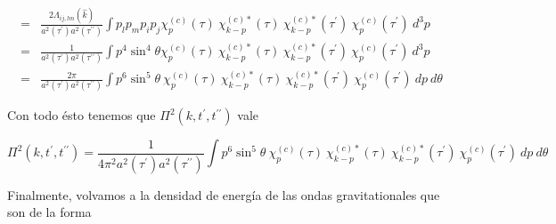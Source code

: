 \begin{equation*}
\begin{split}
        =& \frac{2 \Lambda_{ij,lm} (\hat{k})}{a^2 \left( \tau^\prime \right) a^2 \left( \tau^{\prime \prime} \right)} \int p_l p_m p_i p_j \chi^{(c)}_{p} (\tau) ~ \chi_{k - p}^{(c) *} (\tau) ~ \chi^{(c) *}_{k - p} (\tau^\prime) ~ \chi^{(c)}_{p} (\tau^\prime) ~ d^3 p\\
        =& \frac{1}{a^2 \left( \tau^\prime \right) a^2 \left( \tau^{\prime \prime} \right)} \int p^4 \sin^4 \theta \chi^{(c)}_{p} (\tau) ~ \chi_{k - p}^{(c) *} (\tau) ~ \chi^{(c) *}_{k - p} (\tau^\prime) ~ \chi^{(c)}_{p} (\tau^\prime) ~ d^3 p\\
        =& \frac{2\pi}{a^2 \left( \tau^\prime \right) a^2 \left( \tau^{\prime \prime} \right)} \int p^6 \sin^5 \theta ~ \chi^{(c)}_{p} (\tau) ~ \chi_{k - p}^{(c) *} (\tau) ~ \chi^{(c) *}_{k - p} (\tau^\prime) ~ \chi^{(c)}_{p} (\tau^\prime) ~ dp ~ d\theta
    \end{split}
\end{equation*}

Con todo ésto tenemos que $\Pi^2 \left( k, t^\prime, t^{\prime \prime} \right)$ vale

\begin{equation}
    \Pi^2 \left( k, t^\prime, t^{\prime \prime} \right) = \frac{1}{4 \pi^2 a^2 \left( \tau^\prime \right) a^2 \left( \tau^{\prime \prime} \right)} \int p^6 \sin^5 \theta ~ \chi^{(c)}_{p} (\tau) ~ \chi_{k - p}^{(c) *} (\tau) ~ \chi^{(c) *}_{k - p} (\tau^\prime) ~ \chi^{(c)}_{p} (\tau^\prime) ~ dp ~ d\theta
\end{equation}

Finalmente, volvamos a la densidad de energía de las ondas gravitationales que son de la forma

